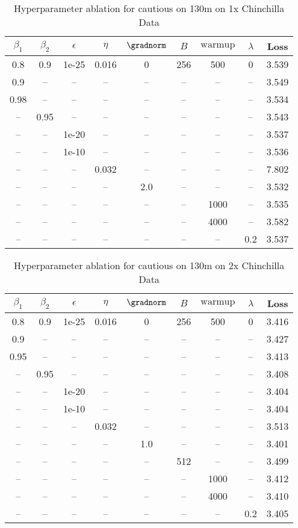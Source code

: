 \begin{table}[h!]
\centering
\caption{Hyperparameter ablation for cautious on 130m on 1x Chinchilla Data}
\label{tab:ablation_cautious_130m_on_1x_chinchilla_data}
\begin{tabular}{ccccccccc}
\toprule
$\beta_1$ & $\beta_2$ & $\epsilon$ & $\eta$ & $\gradnorm$ & $B$ & $\mathrm{warmup}$ & $\lambda$ & Loss \\
\midrule
0.8 & 0.9 & 1e-25 & 0.016 & 0 & 256 & 500 & 0 & 3.539 \\
\midrule
0.9 & -- & -- & -- & -- & -- & -- & -- & 3.549 \\
0.98 & -- & -- & -- & -- & -- & -- & -- & 3.534 \\
-- & 0.95 & -- & -- & -- & -- & -- & -- & 3.543 \\
-- & -- & 1e-20 & -- & -- & -- & -- & -- & 3.537 \\
-- & -- & 1e-10 & -- & -- & -- & -- & -- & 3.536 \\
-- & -- & -- & 0.032 & -- & -- & -- & -- & 7.802 \\
-- & -- & -- & -- & 2.0 & -- & -- & -- & 3.532 \\
-- & -- & -- & -- & -- & -- & 1000 & -- & 3.535 \\
-- & -- & -- & -- & -- & -- & 4000 & -- & 3.582 \\
-- & -- & -- & -- & -- & -- & -- & 0.2 & 3.537 \\
\bottomrule
\end{tabular}
\end{table}

\begin{table}[h!]
\centering
\caption{Hyperparameter ablation for cautious on 130m on 2x Chinchilla Data}
\label{tab:ablation_cautious_130m_on_2x_chinchilla_data}
\begin{tabular}{ccccccccc}
\toprule
$\beta_1$ & $\beta_2$ & $\epsilon$ & $\eta$ & $\gradnorm$ & $B$ & $\mathrm{warmup}$ & $\lambda$ & Loss \\
\midrule
0.8 & 0.9 & 1e-25 & 0.016 & 0 & 256 & 500 & 0 & 3.416 \\
\midrule
0.9 & -- & -- & -- & -- & -- & -- & -- & 3.427 \\
0.95 & -- & -- & -- & -- & -- & -- & -- & 3.413 \\
-- & 0.95 & -- & -- & -- & -- & -- & -- & 3.408 \\
-- & -- & 1e-20 & -- & -- & -- & -- & -- & 3.404 \\
-- & -- & 1e-10 & -- & -- & -- & -- & -- & 3.404 \\
-- & -- & -- & 0.032 & -- & -- & -- & -- & 3.513 \\
-- & -- & -- & -- & 1.0 & -- & -- & -- & 3.401 \\
-- & -- & -- & -- & -- & 512 & -- & -- & 3.499 \\
-- & -- & -- & -- & -- & -- & 1000 & -- & 3.412 \\
-- & -- & -- & -- & -- & -- & 4000 & -- & 3.410 \\
-- & -- & -- & -- & -- & -- & -- & 0.2 & 3.405 \\
\bottomrule
\end{tabular}
\end{table}

